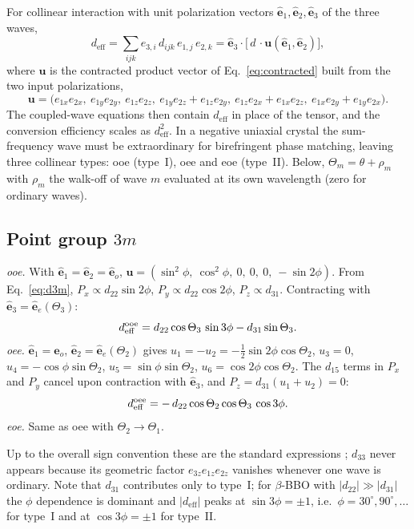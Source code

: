 \documentclass[aps,pra,preprint,amsmath,amssymb,nofootinbib,superscriptaddress]{revtex4-2}
\newcommand{\ueff}{d_{\mathrm{eff}}}
\newcommand{\vecu}[1]{\hat{\bm{#1}}}
\begin{document}
For collinear interaction with unit polarization vectors
$\vecu e_1,\vecu e_2,\vecu e_3$ of the three waves,
\begin{equation}
  \ueff = \sum_{ijk} e_{3,i}\, d_{ijk}\, e_{1,j}\, e_{2,k}
  = \vecu e_3\cdot\big[\,d\,\cdot\bm u(\vecu e_1,\vecu e_2)\big],
  \label{eq:deff_def}
\end{equation}
where $\bm u$ is the contracted product vector of Eq.~\eqref{eq:contracted}
built from the two input polarizations,
\begin{equation}
  \bm u = \big(e_{1x}e_{2x},\ e_{1y}e_{2y},\ e_{1z}e_{2z},\
  e_{1y}e_{2z}+e_{1z}e_{2y},\ e_{1z}e_{2x}+e_{1x}e_{2z},\ e_{1x}e_{2y}+e_{1y}e_{2x}\big).
  \label{eq:u}
\end{equation}
The coupled-wave equations then contain $\ueff$ in place of the tensor,
and the conversion efficiency scales as $\ueff^2$. In a negative uniaxial
crystal the sum-frequency wave must be extraordinary for birefringent
phase matching, leaving three collinear types: ooe (type~I), oee and eoe
(type~II). Below, $\Theta_m=\theta+\rho_m$ with $\rho_m$ the walk-off of
wave $m$ evaluated at its own wavelength (zero for ordinary waves).

\subsection{Point group $3m$}

\emph{ooe.} With $\vecu e_1=\vecu e_2=\vecu e_o$,
$\bm u=(\sin^2\phi,\ \cos^2\phi,\ 0,\ 0,\ 0,\ -\sin2\phi)$.
From Eq.~\eqref{eq:d3m},
$P_x\propto d_{22}\sin2\phi$, $P_y\propto d_{22}\cos2\phi$,
$P_z\propto d_{31}$. Contracting with $\vecu e_3=\vecu e_e(\Theta_3)$:
\begin{equation}
  \ueff^{\rm ooe} = d_{22}\cos\Theta_3\,\sin3\phi - d_{31}\sin\Theta_3 .
  \label{eq:deff_3m_ooe}
\end{equation}
\emph{oee.} $\vecu e_1=\vecu e_o$, $\vecu e_2=\vecu e_e(\Theta_2)$ gives
$u_1=-u_2=-\tfrac12\sin2\phi\cos\Theta_2$, $u_3=0$,
$u_4=-\cos\phi\sin\Theta_2$, $u_5=\sin\phi\sin\Theta_2$,
$u_6=\cos2\phi\cos\Theta_2$. The $d_{15}$ terms in $P_x$ and $P_y$
cancel upon contraction with $\vecu e_3$, and $P_z=d_{31}(u_1+u_2)=0$:
\begin{equation}
  \ueff^{\rm oee} = -\,d_{22}\cos\Theta_2\cos\Theta_3\,\cos3\phi .
  \label{eq:deff_3m_oee}
\end{equation}
\emph{eoe.} Same as oee with $\Theta_2\to\Theta_1$.

Up to the overall sign convention these are the standard expressions
\cite{Dmitriev,Roberts1992}; $d_{33}$ never appears because its
geometric factor $e_{3z}e_{1z}e_{2z}$ vanishes whenever one wave is
ordinary. Note that $d_{31}$ contributes only to type~I; for
$\beta$-BBO with $|d_{22}|\gg|d_{31}|$ the $\phi$ dependence is dominant
and $|\ueff|$ peaks at $\sin3\phi=\pm1$, i.e.\ $\phi=30^\circ,90^\circ,\dots$
for type~I and at $\cos3\phi=\pm1$ for type~II.
\end{document}
